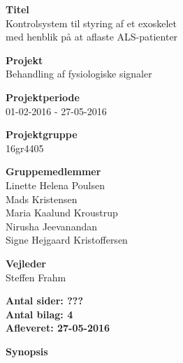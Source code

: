 \begin{minipage}[t]{0.48\textwidth}
\textbf{Titel} \\[5pt]\hspace*{2ex} 
Kontrolsystem til styring af et exoskelet \\\bigskip\hspace*{2ex}
med henblik på at aflaste ALS-patienter

 

\textbf{Projekt} \\[5pt]\bigskip\hspace*{2ex}
Behandling af fysiologiske signaler%

\textbf{Projektperiode} \\[5pt]\bigskip\hspace{2ex}
01-02-2016 - 27-05-2016

\textbf{Projektgruppe} \\[5pt]\bigskip\hspace{2ex}
16gr4405

\textbf{Gruppemedlemmer} \\[5pt]\hspace*{2ex}
Linette Helena Poulsen \\\hspace*{2ex}
Mads Kristensen \\\hspace*{2ex}
Maria Kaalund Kroustrup \\\hspace*{2ex}
Nirusha Jeevanandan \\\bigskip\hspace*{2ex}
Signe Hejgaard Kristoffersen %


\textbf{Vejleder} \\[5pt]\bigskip\hspace*{2ex}
Steffen Frahm %


\vspace*{1cm}

\textbf{Antal sider: ???} \\
\textbf{Antal bilag: 4} \\ 
\textbf{Afleveret: 27-05-2016}

\end{minipage}
\hfill
\begin{minipage}[t]{0.483\textwidth}
\textbf{Synopsis} \\[5pt]
\fbox{\parbox{8cm}{\bigskip\bigskip}}
\end{minipage}

